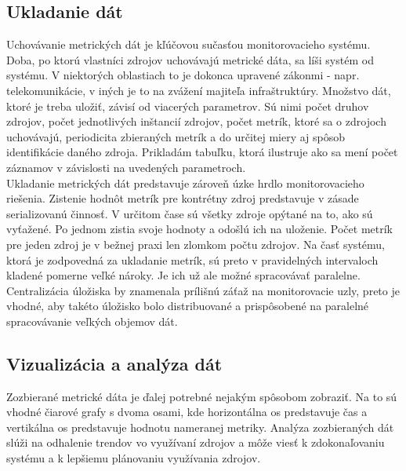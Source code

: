 \documentclass[printed,11pt,twoside,color,cover,table]{fithesis3}
\begin{document}
\subsection{Ukladanie dát}
Uchovávanie metrických dát je kľúčovou sučasťou monitorovacieho systému. Doba, po ktorú vlastníci zdrojov uchovávajú metrické dáta, sa líši systém od systému. V niektorých oblastiach to je dokonca upravené zákonmi - napr. telekomunikácie,
v iných je to na zvážení majiteľa infraštruktúry. Množstvo dát, ktoré je treba uložiť, závisí od viacerých parametrov. Sú nimi počet druhov zdrojov, počet jednotlivých inštancií zdrojov, počet metrík, ktoré sa o zdrojoch
uchovávajú, periodicita zbieraných metrík a do určitej miery aj spôsob identifikácie daného zdroja. Prikladám tabuľku, ktorá ilustruje ako sa mení počet záznamov v závislosti na uvedených parametroch.
\\Ukladanie metrických dát predstavuje zároveň úzke hrdlo monitorovacieho riešenia. Zistenie hodnôt metrík pre kontrétny zdroj predstavuje v zásade serializovanú činnosť. V určitom čase sú všetky zdroje opýtané na to, ako sú vyťažené. Po jednom
zistia svoje hodnoty a odošlú ich na uloženie. Počet metrík pre jeden zdroj je v bežnej praxi len zlomkom počtu zdrojov. Na časť systému, ktorá je zodpovedná za ukladanie metrík, sú preto v pravidelných intervaloch kladené pomerne 
veľké nároky. Je ich už ale možné spracovávať paralelne. Centralizácia úložiska by znamenala prílišnú záťaž na monitorovacie uzly, preto je vhodné, aby takéto úložisko bolo distribuované a prispôsobené na paralelné spracovávanie veľkých
objemov dát.

\subsection{Vizualizácia a analýza dát}
Zozbierané metrické dáta je ďalej potrebné nejakým spôsobom zobraziť. Na to sú vhodné čiarové grafy s dvoma osami, kde horizontálna os predstavuje čas a vertikálna os predstavuje hodnotu nameranej metriky.
Analýza zozbieraných dát slúži na odhalenie trendov vo využívaní zdrojov a môže viesť k zdokonaľovaniu systému a k lepšiemu plánovaniu využívania zdrojov.
\end{document}
